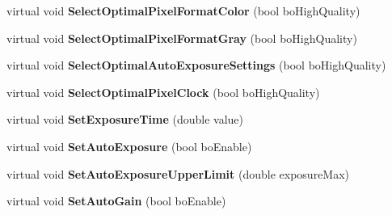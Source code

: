 \begin{DoxyCompactItemize}
\item 
\hypertarget{class_wizard_quick_setup_device_specific_a68adeaef42d17c75b7862245a1a4657c}{virtual void {\bfseries Select\+Optimal\+Pixel\+Format\+Color} (bool bo\+High\+Quality)}\label{class_wizard_quick_setup_device_specific_a68adeaef42d17c75b7862245a1a4657c}

\item 
\hypertarget{class_wizard_quick_setup_device_specific_a2e54c8d31c3fd7023e1beb3bfc6a2d8c}{virtual void {\bfseries Select\+Optimal\+Pixel\+Format\+Gray} (bool bo\+High\+Quality)}\label{class_wizard_quick_setup_device_specific_a2e54c8d31c3fd7023e1beb3bfc6a2d8c}

\item 
\hypertarget{class_wizard_quick_setup_device_specific_a9fd589e110317a1f7e55ceac9be8501e}{virtual void {\bfseries Select\+Optimal\+Auto\+Exposure\+Settings} (bool bo\+High\+Quality)}\label{class_wizard_quick_setup_device_specific_a9fd589e110317a1f7e55ceac9be8501e}

\item 
\hypertarget{class_wizard_quick_setup_device_specific_abedd669107a2ae7b1be5a2ff82bbd1ef}{virtual void {\bfseries Select\+Optimal\+Pixel\+Clock} (bool bo\+High\+Quality)}\label{class_wizard_quick_setup_device_specific_abedd669107a2ae7b1be5a2ff82bbd1ef}

\item 
\hypertarget{class_wizard_quick_setup_device_specific_a0809b76c4fbc7139fdaf10cf70616de9}{virtual void {\bfseries Set\+Exposure\+Time} (double value)}\label{class_wizard_quick_setup_device_specific_a0809b76c4fbc7139fdaf10cf70616de9}

\item 
\hypertarget{class_wizard_quick_setup_device_specific_a2c88eebb0ee204dde0a78b8f60a97bf7}{virtual void {\bfseries Set\+Auto\+Exposure} (bool bo\+Enable)}\label{class_wizard_quick_setup_device_specific_a2c88eebb0ee204dde0a78b8f60a97bf7}

\item 
\hypertarget{class_wizard_quick_setup_device_specific_a3a3881220d6bc3fd31de5514fca7637e}{virtual void {\bfseries Set\+Auto\+Exposure\+Upper\+Limit} (double exposure\+Max)}\label{class_wizard_quick_setup_device_specific_a3a3881220d6bc3fd31de5514fca7637e}

\item 
\hypertarget{class_wizard_quick_setup_device_specific_a2308afcbf4ec6675bf92f1bc76836a23}{virtual void {\bfseries Set\+Auto\+Gain} (bool bo\+Enable)}\label{class_wizard_quick_setup_device_specific_a2308afcbf4ec6675bf92f1bc76836a23}


\end{DoxyCompactItemize}
